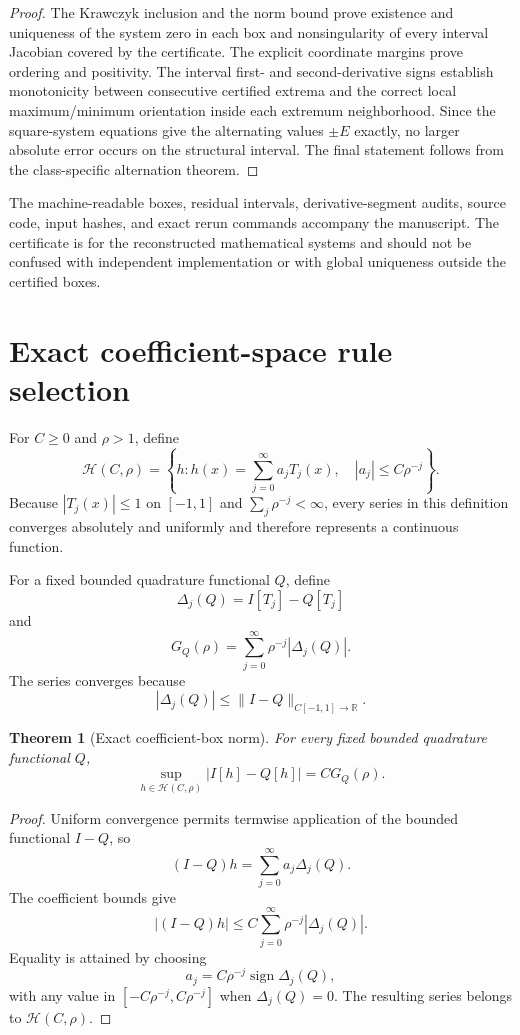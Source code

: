 \documentclass[preprint,12pt]{elsarticle}
\newtheorem{theorem}{Theorem}
\theoremstyle{remark}
\begin{document}
\begin{proof}
The Krawczyk inclusion and the norm bound prove existence and uniqueness
of the system zero in each box and nonsingularity of every interval
Jacobian covered by the certificate. The explicit coordinate margins
prove ordering and positivity. The interval first- and second-derivative
signs establish monotonicity between consecutive certified extrema and
the correct local maximum/minimum orientation inside each extremum
neighborhood. Since the square-system equations give the alternating
values \(\pm E\) exactly, no larger absolute error occurs on the
structural interval. The final statement follows from the
class-specific alternation theorem.
\end{proof}

The machine-readable boxes, residual intervals, derivative-segment
audits, source code, input hashes, and exact rerun commands accompany
the manuscript. The certificate is for the reconstructed mathematical
systems and should not be confused with independent implementation or
with global uniqueness outside the certified boxes.

\FloatBarrier

\section{Exact coefficient-space rule selection}

For \(C\geq0\) and \(\rho>1\), define
\[
\mathcal H(C,\rho)
=
\left\{
h:
h(x)=\sum_{j=0}^{\infty}a_jT_j(x),
\quad
|a_j|\leq C\rho^{-j}
\right\}.
\]
Because \(|T_j(x)|\leq1\) on \([-1,1]\) and
\(\sum_j\rho^{-j}<\infty\), every series in this definition converges
absolutely and uniformly and therefore represents a continuous
function.

For a fixed bounded quadrature functional \(Q\), define
\[
\Delta_j(Q)=I[T_j]-Q[T_j]
\]
and
\[
G_Q(\rho)
=
\sum_{j=0}^{\infty}\rho^{-j}|\Delta_j(Q)|.
\]
The series converges because
\[
|\Delta_j(Q)|
\leq
\|I-Q\|_{C[-1,1]\to\mathbb R}.
\]

\begin{theorem}[Exact coefficient-box norm]
For every fixed bounded quadrature functional \(Q\),
\[
\sup_{h\in\mathcal H(C,\rho)}
|I[h]-Q[h]|
=
C G_Q(\rho).
\]
\end{theorem}

\begin{proof}
Uniform convergence permits termwise application of the bounded
functional \(I-Q\), so
\[
(I-Q)h
=
\sum_{j=0}^{\infty}a_j\Delta_j(Q).
\]
The coefficient bounds give
\[
|(I-Q)h|
\leq
C\sum_{j=0}^{\infty}
\rho^{-j}|\Delta_j(Q)|.
\]
Equality is attained by choosing
\[
a_j
=
C\rho^{-j}\operatorname{sign}\Delta_j(Q),
\]
with any value in \([-C\rho^{-j},C\rho^{-j}]\) when
\(\Delta_j(Q)=0\). The resulting series belongs to
\(\mathcal H(C,\rho)\).
\end{proof}
\end{document}
